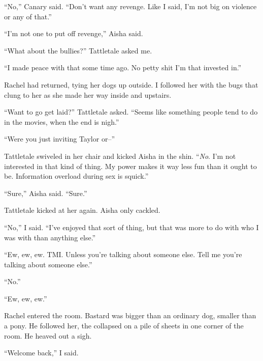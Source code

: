 ``No,'' Canary said.  ``Don't want any revenge.  Like I said, I'm not big on violence or any of that.''



``I'm not one to put off revenge,'' Aisha said.



``What about the bullies?''  Tattletale asked me.



``I made peace with that some time ago.  No petty shit I'm that invested in.''



Rachel had returned, tying her dogs up outside.  I followed her with the bugs that clung to her as she made her way inside and upstairs.



``Want to go get laid?''  Tattletale asked.  ``Seems like something people tend to do in the movies, when the end is nigh.''



``Were you just inviting Taylor or--''



Tattletale swiveled in her chair and kicked Aisha in the shin.  ``\emph{No}.  I'm not interested in that kind of thing.  My power makes it way less fun than it ought to be.  Information overload during sex is squick.''



``Sure,'' Aisha said.  ``Sure.''



Tattletale kicked at her again.  Aisha only cackled.



``No,'' I said.  ``I've enjoyed that sort of thing, but that was more to do with who I was with than anything else.''



``Ew, ew, ew.  TMI.  Unless you're talking about someone else.  Tell me you're talking about someone else.''



``No.''



``Ew, ew, ew.''



Rachel entered the room.  Bastard was bigger than an ordinary dog, smaller than a pony.  He followed her, the collapsed on a pile of sheets in one corner of the room.  He heaved out a sigh.



``Welcome back,'' I said.



